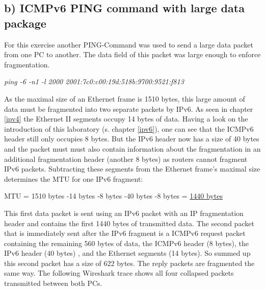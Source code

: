 \subsection{b) ICMPv6 PING command with large data package}
For this exercise another PING-Command was used to send a large data packet from one PC to another. The data field of this packet was large enough to enforce fragmentation.
\begin{center}
	\textit{ping -6 -n1 -l 2000 2001:7c0:c00:19d:518b:9700:9521:f813}
\end{center}
As the maximal size of an Ethernet frame is 1510 bytes, this large amount of data must be fragmented into two separate packets by IPv6. As seen in chapter \ref{ipv4} the Ethernet II segments occupy 14 bytes of data. Having a look on the introduction of this laboratory (s. chapter \ref{ipv6}), one can see that the ICMPv6 header still only occupies 8 bytes. But the IPv6 header now has a size of 40 bytes and the packet must must also contain information about the fragmentation in an additional fragmentation header (another 8 bytes) as routers cannot fragment IPv6 packets. Subtracting these segments from the Ethernet frame's maximal size determines the MTU for one IPv6 fragment:
\begin{center}
	MTU = 1510 bytes -14 bytes -8 bytes -40 bytes -8 bytes
		= \underline{1440 bytes} 
\end{center} 
This first data packet is sent using an IPv6 packet with an IP fragmentation header and contains the first 1440 bytes of transmitted data. The second packet that is immediately sent after the IPv6 fragment is a ICMPv6 request packet containing the remaining 560 bytes of data, the ICMPv6 header (8 bytes), the IPv6 header (40 bytes) , and the Ethernet segments (14 bytes). So summed up this second packet has a size of 622 bytes. The reply packets are fragmented the same way. The following Wireshark trace shows all four collapsed packets transmitted between both PCs.
\\
